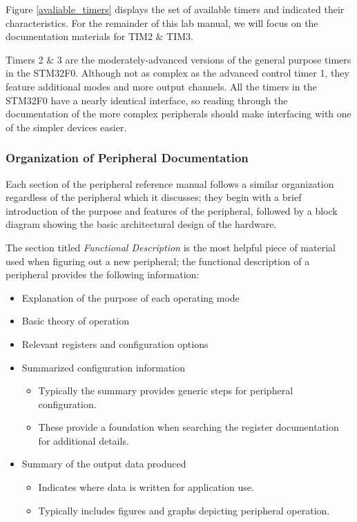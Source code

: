 \documentclass[openany,11pt,fleqn]{book} %
\begin{document}
    Figure \ref{avaliable_timers} displays the set of available timers and indicated their characteristics. For the remainder of this lab manual, we will focus on the documentation materials for TIM2 \& TIM3. 
    
    Timers 2 \& 3 are the moderately-advanced versions of the general purpose timers in the STM32F0. Although not as complex as the advanced control timer 1, they feature additional modes and more output channels. All the timers in the STM32F0 have a nearly identical interface, so reading through the documentation of the more complex peripherals should make interfacing with one of the simpler devices easier. 
    
    \subsubsection{Organization of Peripheral Documentation}
    Each section of the peripheral reference manual follows a similar organization regardless of the peripheral which it discusses; they begin with a brief introduction of the purpose and features of the peripheral, followed by a block diagram showing the basic architectural design of the hardware. 
    
    The section titled \textit{Functional Description} is the most helpful piece of material used when figuring out a new peripheral; the functional description of a peripheral provides the following information:
    
    \begin{itemize}
        \item Explanation of the purpose of each operating mode 
        \item Basic theory of operation 
        \item Relevant registers and configuration options 
        \item Summarized configuration information
        \begin{itemize}
            \item Typically the summary provides generic steps for peripheral configuration. 
            \item These provide a foundation when searching the register documentation for additional details. 
        \end{itemize}
        \item Summary of the output data produced
        \begin{itemize}
            \item Indicates where data is written for application use.
            \item Typically includes figures and graphs depicting peripheral operation.
        \end{itemize}
    \end{itemize}
\end{document}
